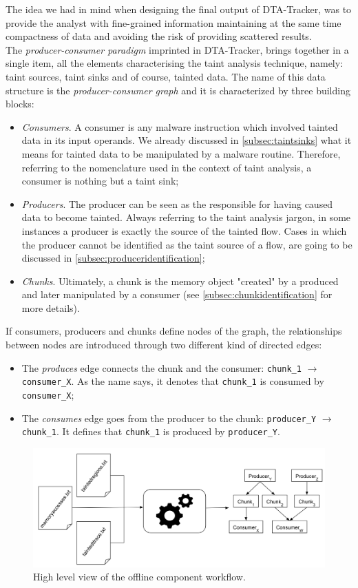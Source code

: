 \documentclass[LaM,binding=0.6cm]{sapthesis}
\begin{document}
The idea we had in mind when designing the final output of DTA-Tracker, was to provide the analyst with fine-grained information maintaining at the same time compactness of data and avoiding the risk of providing scattered results.\\
The \textit{producer-consumer paradigm} imprinted in DTA-Tracker, brings together in a single item, all the elements characterising the taint analysis technique, namely: taint sources, taint sinks and of course, tainted data. The name of this data structure is the \textit{producer-consumer graph} and it is characterized by three building blocks:
\begin{itemize}
\item \textit{Consumers}. A consumer is any malware instruction which involved tainted data in its input operands. We already discussed in \autoref{subsec:taintsinks} what it means for tainted data to be manipulated by a malware routine. Therefore, referring to the nomenclature used in the context of taint analysis, a consumer is nothing but a taint sink;
\item \textit{Producers}. The producer can be seen as the responsible for having caused data to become tainted. Always referring to the taint analysis jargon, in some instances a producer is exactly the source of the tainted flow. Cases in which the producer cannot be identified as the taint source of a flow, are going to be discussed in \autoref{subsec:produceridentification};
\item \textit{Chunks}. Ultimately, a chunk is the memory object "created" by a produced and later manipulated by a consumer (see \autoref{subsec:chunkidentification} for more details). 
\end{itemize}
If consumers, producers and chunks define nodes of the graph, the relationships between nodes are introduced through two different kind of directed edges:
\begin{itemize}
\item The \textit{produces} edge connects the chunk and the consumer: \texttt{chunk\_1} $\rightarrow$ \texttt{consumer\_X}. As the name says, it denotes that \texttt{chunk\_1}  is consumed by \texttt{consumer\_X};
\item The \textit{consumes} edge goes from the producer to the chunk: \texttt{producer\_Y} $\rightarrow$ \texttt{chunk\_1}. It defines that \texttt{chunk\_1} is produced by \texttt{producer\_Y}.
\end{itemize}

\begin{figure}[h!]
\centering
\includegraphics[scale=.45]{images/dtatracker3}
\caption{High level view of the offline component workflow.}
\end{figure}
\end{document}

